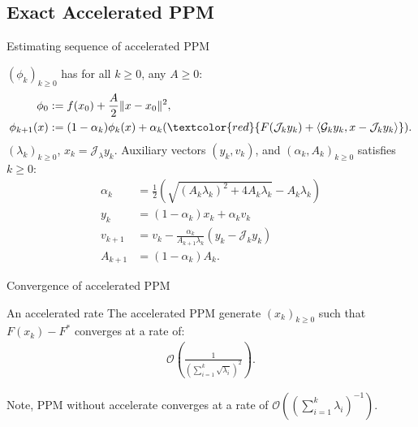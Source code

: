 \documentclass[11pt]{beamer}
\begin{document}
    \subsection{Exact Accelerated PPM}
        \begin{frame}{Estimating sequence of accelerated PPM}
            \begin{definition}
                {\small
                    \label{def:nes-est-seq-acc-ppm}
                    $(\phi_k)_{k \ge0}$ has for all $k \ge0$, any $A \ge 0$: 
                    \begin{align*}
                        \phi_0 &:= f(x_0) + \frac{A}{2}\Vert x - x_0\Vert^2, 
                        \\
                        \phi_{k + 1}(x) &:= 
                        (1 - \alpha_k)\phi_k(x)
                        + 
                        \alpha_k(
                            \textcolor{red}
                            {
                                F(\mathcal J_k y_k) + \langle \mathcal G_k y_k, x - \mathcal J_k y_k\rangle
                            }
                        ).    
                    \end{align*}
                    $(\lambda_k)_{k \ge 0}$, $x_k = \mathcal J_\lambda y_k$. 
                    Auxiliary vectors $(y_k, v_k)$, and $(\alpha_k, A_k)_{k\ge 0}$ satisfies $k\ge0$:
                    \begin{align*}
                        \alpha_k &= \frac{1}{2}\left(
                            \sqrt{(A_k\lambda_k)^2 + 4A_k \lambda_k}
                            - A_k\lambda_k
                        \right) 
                        \\
                        y_k &= (1 - \alpha_k)x_k + \alpha_k v_k
                        \\
                        v_{k + 1}
                        &= 
                        v_k - \frac{\alpha_k}{A_{k + 1}\lambda_k}(y_k - \mathcal J_k y_k)
                        \\
                        A_{k + 1} &= (1 - \alpha_k)A_k. 
                    \end{align*}
                }
            \end{definition}
        \end{frame}
        \begin{frame}{Convergence of accelerated PPM} 
            \begin{block}{An accelerated rate}
                The accelerated PPM generate $(x_k)_{k\ge 0}$ such that $F(x_k) - F^*$ converges at a rate of: 
                {\large
                \begin{align*}
                    \mathcal O\left(
                        \frac{1}{\left(
                            \sum_{i = 1}^{k}\sqrt{\lambda_i}
                        \right)^2}
                    \right). 
                \end{align*}    
                }
            \end{block}
            Note, PPM without accelerate converges at a rate of $\mathcal O((\sum_{i = 1}^{k}\lambda_i)^{-1})$. 
        \end{frame}
\end{document}
